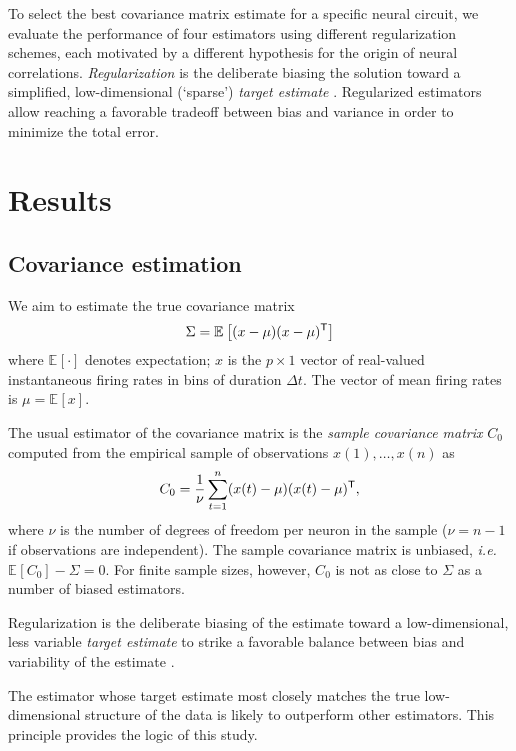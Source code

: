 \documentclass[10pt]{article}
\newcommand{\T}{{\sf T}}
\newcommand{\E}[2][]{\mathbb E_{#1}\left[ #2\right]}    %
\begin{document}
To select the best covariance matrix estimate for a specific neural circuit, we evaluate the performance of four estimators using different regularization schemes, each motivated by  a different hypothesis for the origin of neural correlations. \emph{Regularization} is the deliberate biasing the solution toward a simplified, low-dimensional (`sparse') \emph{target estimate} \cite{Schafer:2005,Bickel:2006}.
Regularized estimators allow reaching a favorable tradeoff between bias and variance in order to minimize the total error.

\section*{Results}

\subsection*{Covariance estimation}
We aim to estimate the true covariance matrix 
\begin{equation}\label{eq:true-covariance}
\Sigma = \E{(x-\mu)(x-\mu)^\T}
\end{equation}
where $\E{\cdot}$ denotes expectation; $x$ is the $p\times 1$ vector of real-valued instantaneous firing rates in bins of duration $\Delta t$. The vector of mean firing rates is $\mu = \E{x}$.  

The usual estimator of the covariance matrix is the \emph{sample covariance matrix} $C_0$ computed from the empirical sample of observations $x(1),\ldots,x(n)$ as
\begin{equation}
C_0 = \frac 1 \nu \sum\limits_{t=1}^n (x(t)-\mu)(x(t)-\mu)^\T, 
\end{equation}
where $\nu$ is the number of degrees of freedom per neuron in the sample ($\nu=n-1$ if observations are independent).  
The sample covariance matrix is unbiased, \emph{i.e.} $\E{C_0}-\Sigma=0$.
For finite sample sizes, however, $C_0$ is not as close to $\Sigma$ as a number of biased estimators.

Regularization is the deliberate biasing of the estimate toward a low-dimensional, less variable \emph{target estimate} to strike a favorable balance between bias and variability of the estimate \cite{Bickel:2006,Ledoit:2004}.  

The estimator whose target estimate most closely matches the true low-dimensional structure of the data is likely to outperform other estimators. This principle provides the logic of this study. 
\end{document}
